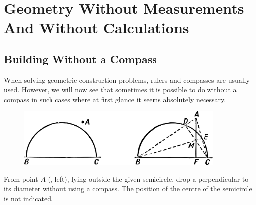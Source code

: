 



\chapter[Geometry Without Measurements And Calculations]{Geometry Without Measurements And Without Calculations}
\label{ch-10}



\section{Building Without a Compass}
\label{sec-10.1}

When solving geometric construction problems, rulers and compasses are usually used. However, we will now see that sometimes it is possible to do without a compass in such cases where at first glance it seems absolutely necessary.

\begin{figure}[h!]
\centering
\includegraphics[width=0.9\textwidth]{figures/ch-10/fig-141.pdf}
\end{figure}

\ques From point $A$ (, left), lying outside the given semicircle, drop a perpendicular to its diameter without using a compass. The position of the centre of the semicircle is not indicated.

